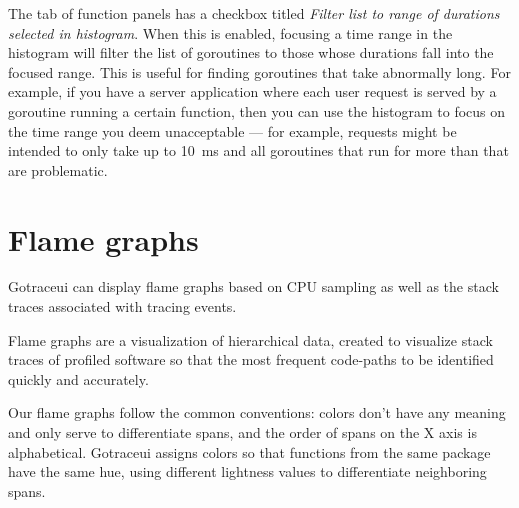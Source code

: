 \documentclass[10pt,letterpaper,oneside,openany,english]{memoir}
\begin{document}
The  tab of function panels has a checkbox titled \emph{Filter list to range of durations selected in histogram}.
When this is enabled, focusing a time range in the histogram will filter the list of goroutines to those whose durations fall into the focused range.
This is useful for finding goroutines that take abnormally long.
For example, if you have a server application where each user request is served by a goroutine running a certain function,
then you can use the histogram to focus on the time range you deem unacceptable ---
for example, requests might be intended to only take up to \qty{10}{\milli\second} and all goroutines that run for more than that are problematic.

\section{Flame graphs}\label{flamegraphs}

Gotraceui can display flame graphs based on CPU sampling as well as the stack traces associated with tracing
events.

\begin{displayquote}
  Flame graphs are a visualization of hierarchical data, created to visualize stack traces of profiled
  software so that the most frequent code-paths to be identified quickly and accurately.
\end{displayquote}

Our flame graphs follow the common conventions:
colors don't have any meaning and only serve to differentiate spans,
and the order of spans on the X axis is alphabetical.
Gotraceui assigns colors so that functions from the same package have the same hue,
using different lightness values to differentiate neighboring spans.
\end{document}
